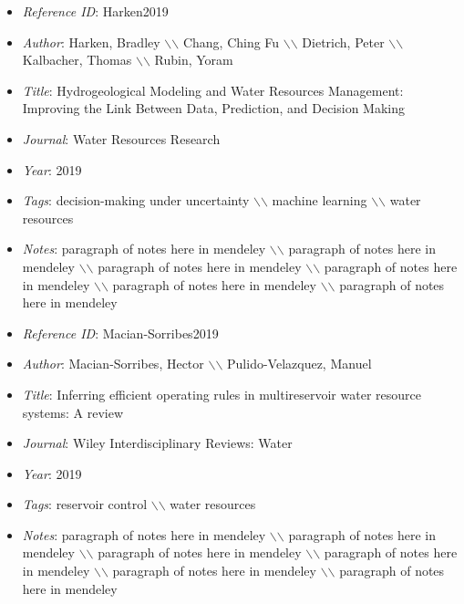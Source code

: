 \documentclass[11pt]{article}
\begin{document}
\noindent\citep{Harken2019} 
\begin{itemize} 
\item{\textit{Reference ID}:  Harken2019} 

\item{\textit{Author}:  Harken, Bradley $\backslash$$\backslash$ Chang, Ching Fu $\backslash$$\backslash$ Dietrich, Peter $\backslash$$\backslash$ Kalbacher, Thomas $\backslash$$\backslash$ Rubin, Yoram} 

\item{\textit{Title}:  Hydrogeological Modeling and Water Resources Management: Improving the Link Between Data, Prediction, and Decision Making} 

\item{\textit{Journal}:  Water Resources Research} 

\item{\textit{Year}:  2019} 

\item{\textit{Tags}:  decision-making under uncertainty $\backslash$$\backslash$ machine learning $\backslash$$\backslash$ water resources} 

\item{\textit{Notes}:  paragraph of notes here in mendeley $\backslash$$\backslash$ paragraph of notes here in mendeley $\backslash$$\backslash$ paragraph of notes here in mendeley $\backslash$$\backslash$ paragraph of notes here in mendeley $\backslash$$\backslash$ paragraph of notes here in mendeley $\backslash$$\backslash$ paragraph of notes here in mendeley} 

\end{itemize}\medskip



\noindent\citep{Macian-Sorribes2019} 
\begin{itemize} 
\item{\textit{Reference ID}:  Macian-Sorribes2019} 

\item{\textit{Author}:  Macian-Sorribes, Hector $\backslash$$\backslash$ Pulido-Velazquez, Manuel} 

\item{\textit{Title}:  Inferring efficient operating rules in multireservoir water resource systems: A review} 

\item{\textit{Journal}:  Wiley Interdisciplinary Reviews: Water} 

\item{\textit{Year}:  2019} 

\item{\textit{Tags}:  reservoir control $\backslash$$\backslash$ water resources} 

\item{\textit{Notes}:  paragraph of notes here in mendeley $\backslash$$\backslash$ paragraph of notes here in mendeley $\backslash$$\backslash$ paragraph of notes here in mendeley $\backslash$$\backslash$ paragraph of notes here in mendeley $\backslash$$\backslash$ paragraph of notes here in mendeley $\backslash$$\backslash$ paragraph of notes here in mendeley} 

\end{itemize}\medskip
\end{document}
